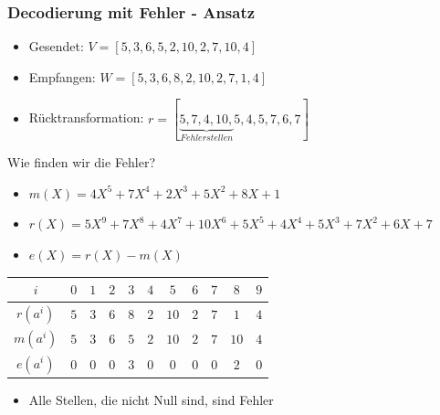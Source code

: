 \documentclass[11pt,aspectratio=169]{beamer}
\begin{document}
	\begin{frame}
		\frametitle{Decodierung mit Fehler - Ansatz}	
		
		\begin{itemize}
			\item Gesendet: $V = [5,3,6,5,2,10,2,7,10,4]$
			
			\item Empfangen: $W = [5,3,6,8,2,10,2,7,1,4]$
			
			\item Rücktransformation: $r = [\underbrace{5,7,4,10,}_{Fehlerstellen}5,4,5,7,6,7]$
		\end{itemize}
		
		Wie finden wir die Fehler?
		
		\begin{itemize}
			\item $m(X) = 4X^5 + 7X^4 + 2X^3 + 5X^2 + 8X + 1$
			
			\item $r(X) = 5X^9 + 7X^8 + 4X^7 + 10X^6 + 5X^5 + 4X^4 + 5X^3 + 7X^2 + 6X + 7$
			
			\item $e(X) = r(X) - m(X)$
		\end{itemize}	
		
		\begin{center}
			
		\begin{tabular}{c c c c c c c c c c c}
			\hline
			$i$& $0$& $1$& $2$& $3$& $4$& $5$& $6$& $7$& $8$& $9$\\
			\hline
			$r(a^{i})$& $5$& $3$& $6$& $8$& $2$& $10$& $2$& $7$& $1$& $4$\\
			$m(a^{i})$& $5$& $3$& $6$& $5$& $2$& $10$& $2$& $7$& $10$& $4$\\
			$e(a^{i})$& $0$& $0$& $0$& $3$& $0$& $0$& $0$& $0$& $2$& $0$\\
			\hline
		\end{tabular}	
			
		\end{center}
		
		\begin{itemize}
			\item Alle Stellen, die nicht Null sind, sind Fehler
		\end{itemize}
		
	\end{frame}
\end{document}
